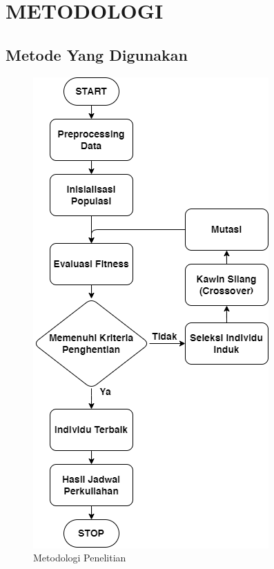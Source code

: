 \chapter{METODOLOGI}
\label{chap:metodologi}



\section{Metode Yang Digunakan}
\label{sec:metode}


\begin{figure} [ht] \centering
  \includegraphics[scale=0.6]{gambar/metodologi.png}
  \caption{Metodologi Penelitian}
  \label{fig:metodologi}
\end{figure}

